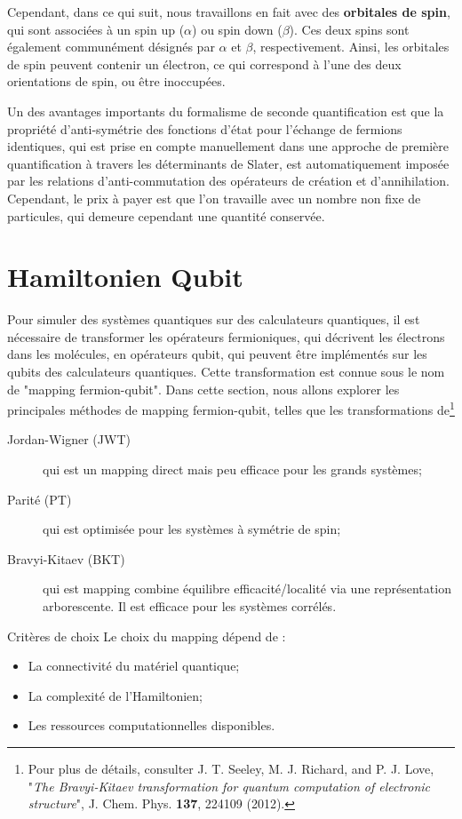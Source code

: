 \documentclass[12pt,a4paper,svgnames,x11names,rgb,table]{article} %
\numberwithin{equation}{section} %
\numberwithin{figure}{section} %
\numberwithin{table}{section} %
\begin{document}
Cependant, dans ce qui suit, nous travaillons en fait avec des \textbf{orbitales de spin}, qui sont associées à un spin up ($\alpha$) ou spin down ($\beta$). Ces deux spins sont également communément désignés par $\alpha$ et $\beta$, respectivement. Ainsi, les orbitales de spin peuvent contenir un électron, ce qui correspond à l'une des deux orientations de spin, ou être inoccupées.

Un des avantages importants du formalisme de seconde quantification est que la propriété d'anti-symétrie des fonctions d'état pour l'échange de fermions identiques, qui est prise en compte manuellement dans une approche de première quantification à travers les déterminants de Slater, est automatiquement imposée par les relations d'anti-commutation des opérateurs de création et d'annihilation. Cependant, le prix à payer est que l'on travaille avec un nombre non fixe de particules, qui demeure cependant une quantité conservée.


\section{Hamiltonien Qubit}

Pour simuler des systèmes quantiques sur des calculateurs quantiques, il est nécessaire de transformer les opérateurs fermioniques, qui décrivent les électrons dans les molécules, en opérateurs qubit, qui peuvent être implémentés sur les qubits des calculateurs quantiques. Cette transformation est connue sous le nom de "mapping fermion-qubit". Dans cette section, nous allons explorer les principales méthodes de mapping fermion-qubit, telles que les transformations de\footnote{Pour plus de détails, consulter J. T. Seeley, M. J. Richard, and P. J. Love, "\textit{The Bravyi-Kitaev transformation for quantum computation of electronic structure}", J. Chem. Phys. \textbf{137}, 224109 (2012).}
\begin{description}
\item[Jordan-Wigner (JWT)] qui est un mapping direct mais peu efficace pour les grands systèmes;
\item[Parité (PT)] qui est optimisée pour les systèmes à symétrie de spin;
\item[Bravyi-Kitaev (BKT)] qui est mapping combine équilibre efficacité/localité via une représentation arborescente. Il est efficace pour les systèmes corrélés.
\end{description}

\begin{remark}{Critères de choix}{}
Le choix du mapping dépend de :
\begin{itemize}
\item La connectivité du matériel quantique;
\item La complexité de l'Hamiltonien;
\item Les ressources computationnelles disponibles.
\end{itemize}
\end{remark}
\end{document}
